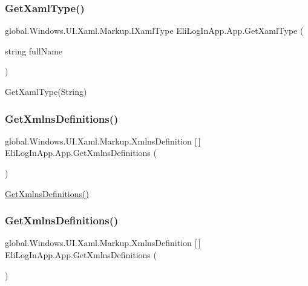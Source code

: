 \subsubsection{\texorpdfstring{Get\+Xaml\+Type()}{GetXamlType()}\hspace{0.1cm}{\footnotesize\ttfamily [6/6]}}
{\footnotesize\ttfamily global.\+Windows.\+U\+I.\+Xaml.\+Markup.\+I\+Xaml\+Type Eli\+Log\+In\+App.\+App.\+Get\+Xaml\+Type (\begin{DoxyParamCaption}\item[{string}]{full\+Name }\end{DoxyParamCaption})\hspace{0.3cm}{\ttfamily [inline]}}



Get\+Xaml\+Type(\+String) 

\mbox{\label{class_eli_log_in_app_1_1_app_a1bb4d4a1609ef93a317c8d25a87d2d0c}} 
\subsubsection{\texorpdfstring{Get\+Xmlns\+Definitions()}{GetXmlnsDefinitions()}\hspace{0.1cm}{\footnotesize\ttfamily [1/3]}}
{\footnotesize\ttfamily global.\+Windows.\+U\+I.\+Xaml.\+Markup.\+Xmlns\+Definition \mbox{[}$\,$\mbox{]} Eli\+Log\+In\+App.\+App.\+Get\+Xmlns\+Definitions (\begin{DoxyParamCaption}{ }\end{DoxyParamCaption})\hspace{0.3cm}{\ttfamily [inline]}}



\hyperlink{class_eli_log_in_app_1_1_app_a1bb4d4a1609ef93a317c8d25a87d2d0c}{Get\+Xmlns\+Definitions()} 

\mbox{\label{class_eli_log_in_app_1_1_app_a1bb4d4a1609ef93a317c8d25a87d2d0c}} 
\subsubsection{\texorpdfstring{Get\+Xmlns\+Definitions()}{GetXmlnsDefinitions()}\hspace{0.1cm}{\footnotesize\ttfamily [2/3]}}
{\footnotesize\ttfamily global.\+Windows.\+U\+I.\+Xaml.\+Markup.\+Xmlns\+Definition \mbox{[}$\,$\mbox{]} Eli\+Log\+In\+App.\+App.\+Get\+Xmlns\+Definitions (\begin{DoxyParamCaption}{ }\end{DoxyParamCaption})\hspace{0.3cm}{\ttfamily [inline]}}



